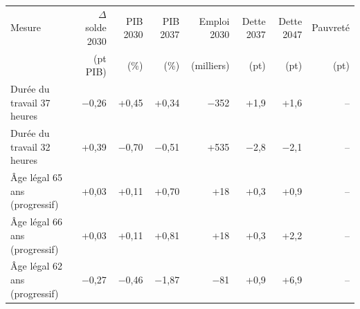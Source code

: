 \begin{tabular}{p{5.2cm}rrrrrrr}
\toprule
Mesure & $\Delta$solde 2030 & PIB 2030 & PIB 2037 & Emploi 2030 & Dette 2037 & Dette 2047 & Pauvreté \\
 & (pt PIB) & (\%) & (\%) & (milliers) & (pt) & (pt) & (pt) \\
\midrule
Durée du travail 37 heures & $-$0{,}26 & +0{,}45 & +0{,}34 & $-$352 & +1{,}9 & +1{,}6 & -- \\
Durée du travail 32 heures & +0{,}39 & $-$0{,}70 & $-$0{,}51 & +535 & $-$2{,}8 & $-$2{,}1 & -- \\
Âge légal 65 ans (progressif) & +0{,}03 & +0{,}11 & +0{,}70 & +18 & +0{,}3 & +0{,}9 & -- \\
Âge légal 66 ans (progressif) & +0{,}03 & +0{,}11 & +0{,}81 & +18 & +0{,}3 & +2{,}2 & -- \\
Âge légal 62 ans (progressif) & $-$0{,}27 & $-$0{,}46 & $-$1{,}87 & $-$81 & +0{,}9 & +6{,}9 & -- \\
\bottomrule
\end{tabular}
